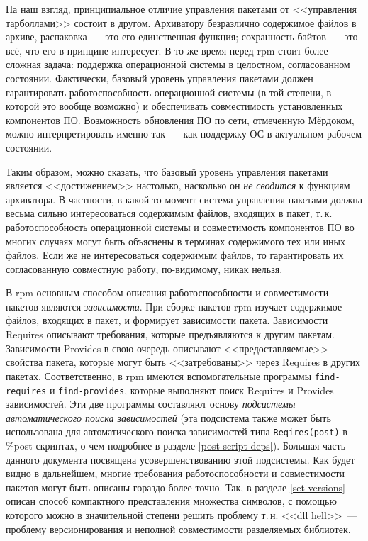 \documentclass[russian,a4paper,12pt,titlepage]{article}
\begin{document}
На наш взгляд, принципиальное отличие управления пакетами от <<управления тарболлами>> состоит в другом.
Архиватору безразлично содержимое файлов в архиве, распаковка~--- это его единственная функция; сохранность
байтов~--- это всё, что его в принципе интересует.  В то же время перед rpm стоит более сложная задача:
поддержка операционной системы в целостном, согласованном состоянии.  Фактически, базовый уровень
управления пакетами должен гарантировать работоспособность операционной системы (в той степени,
в которой это вообще возможно) и обеспечивать совместимость установленных компонентов ПО.  Возможность
обновления ПО по сети, отмеченную Мёрдоком, можно интерпретировать именно так~--- как поддержку ОС
в актуальном рабочем состоянии.

Таким образом, можно сказать, что базовый уровень управления пакетами является <<достижением>> настолько,
насколько он \textit{не сводится} к функциям архиватора.  В частности, в какой-то момент система управления
пакетами должна весьма сильно интересоваться содержимым файлов, входящих в пакет, т.\,к. работоспособность
операционной системы и совместимость компонентов ПО во многих случаях могут быть объяснены в терминах
содержимого тех или иных файлов.  Если же не интересоваться содержимым файлов, то гарантировать их согласованную
совместную работу, по-видимому, никак нельзя.

В rpm основным способом описания работоспособности и совместимости пакетов являются \textit{зависимости}.
При сборке пакетов rpm изучает содержимое файлов, входящих в пакет, и формирует зависимости пакета.
Зависимости Requires описывают требования, которые предъявляются к другим пакетам.  Зависимости Provides
в свою очередь описывают <<предоставляемые>> свойства пакета, которые могут быть <<затребованы>> через
Requires в других пакетах.  Соответственно, в rpm имеются вспомогательные программы \verb|find-requires|
и \verb|find-provides|, которые выполняют поиск Requires и Provides зависимостей.  Эти две программы
составляют основу \textit{подсистемы автоматического поиска зависимостей} (эта подсистема также может быть
использована для автоматического поиска зависимостей типа \verb|Reqires(post)| в \%post-скриптах,
о чем подробнее в разделе \ref{post-script-deps}).  Большая часть данного документа посвящена
усовершенствованию этой подсистемы.  Как будет видно в дальнейшем, многие требования работоспособности
и совместимости пакетов могут быть описаны гораздо более точно.  Так, в разделе \ref{set-versions} описан
способ компактного представления множества символов, с помощью которого можно в значительной степени
решить проблему т.\,н. <<dll hell>>~--- проблему версионирования и неполной совместимости разделяемых библиотек.
\end{document}
